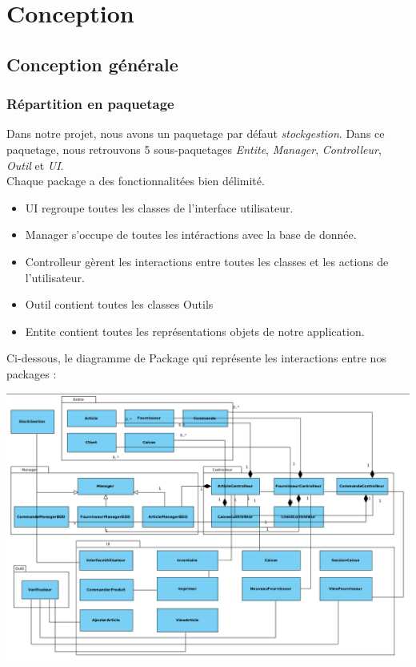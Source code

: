 \part{Conception}

\chapter{Conception générale}

\section{Répartition en paquetage}

Dans notre projet, nous avons un paquetage par défaut \textit{stockgestion}. Dans ce paquetage, nous retrouvons 5 sous-paquetages \textit{Entite}, \textit{Manager}, \textit{Controlleur}, \textit{Outil} et \textit{UI}.\\

Chaque package a des fonctionnalitées bien délimité. 
\begin{itemize}
	\item UI regroupe toutes les classes de l'interface utilisateur.
	\item Manager s'occupe de toutes les intéractions avec la base de donnée.
	\item Controlleur gèrent les interactions entre toutes les classes et les actions de l'utilisateur.
	\item Outil contient toutes les classes Outils
	\item Entite contient toutes les représentations objets de notre application.
\end{itemize}

Ci-dessous, le diagramme de Package qui représente les interactions entre nos packages :
\begin{center}
\includegraphics[width=14cm]{./Conception/DiagrammeDeClassePackage}
\end{center}

